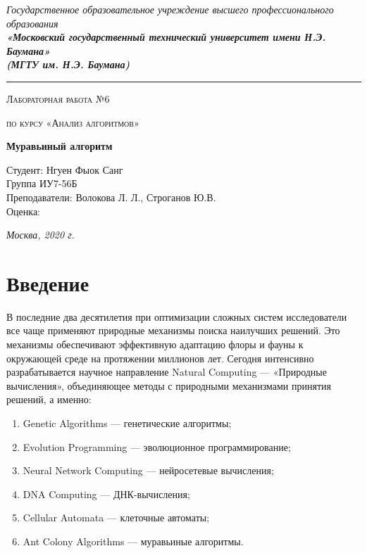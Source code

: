 \documentclass[12pt, a4paper]{report}
\begin{document}
 	\begin{titlepage}
 		
 		\begin{center}
 			\Large
 			{\sl Государственное образовательное учреждение высшего профессионального образования\\
 				{\bf«Московский государственный технический университет имени Н.Э. Баумана»\\
 					(МГТУ им. Н.Э. Баумана)}}
 			\noindent\rule{\textwidth}{2pt}
 			\vspace{3cm}
 			
 			{\scshape\LARGE Лабораторная работа №6 \par}
 			\vspace{0.5cm}	
 			{\scshape\LARGE по курсу «Анализ алгоритмов» \par}
 			\vspace{1.5cm}
 			{\huge\bfseries Муравьиный алгоритм \par}
 			\vspace{2cm}
 			\begin{flushleft}
 				\Large Студент: Нгуен Фыок Санг\\
 				\Large Группа ИУ7-56Б\\
 				Преподаватели:  Волокова Л. Л., Строганов Ю.В.\\
 				Оценка:
 			\end{flushleft}
 			
 			\vfill
 			\Large \textit {Москва, 2020 г.}
 			
 		\end{center}
 		
 	\end{titlepage}
 	
 	\tableofcontents
	\newpage
	
	\chapter*{Введение}
	
	
	В последние два десятилетия при оптимизации сложных систем исследователи все чаще применяют природные механизмы поиска наилучших решений. Это механизмы обеспечивают эффективную адаптацию флоры и фауны к окружающей среде на протяжении миллионов лет. Сегодня интенсивно разрабатывается научное направление Natural Computing — «Природные вычисления», объединяющее методы с природными механизмами принятия решений, а именно:
	\begin{enumerate}
	\item Genetic Algorithms — генетические алгоритмы;
	\item Evolution Programming — эволюционное программирование;
	\item Neural Network Computing — нейросетевые вычисления;
	\item DNA Computing — ДНК-вычисления;
	\item Cellular Automata — клеточные автоматы;
	\item Ant Colony Algorithms — муравьиные алгоритмы.
	\end{enumerate}
\end{document}
